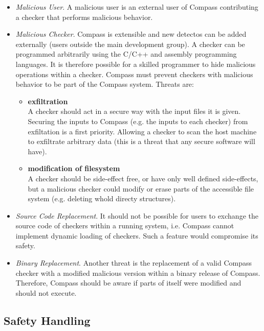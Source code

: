 \begin{itemize}
\item \emph{Malicious User}. A malicious user is an external user of Compass contributing a checker that performs malicious behavior.
\item \emph{Malicious Checker}. Compass is extensible and new detectos can be added externally (users outside the main development group).
  A checker can be programmed arbitrarily using the C/C++ and assembly programming languages. 
  It is therefore possible for a skilled programmer to hide malicious operations within a
  checker.  Compass must prevent checkers with malicious behavior to be part of the
  Compass system. Threats are:
   \begin{itemize}
      \item {\bf exfiltration} \\
         A checker should act in a secure way with the input files it is given.
         Securing the inputs to Compass (e.g. the inputs to each checker) from 
         exfiltation is a first priority. Allowing a checker to scan the host 
         machine to exfiltrate arbitrary data (this is a threat that any secure
         software will have).
      \item {\bf modification of filesystem} \\
         A checker should be side-effect free, or have only well defined side-effects, 
         but a malicious checker could modify or erase parts of the accessible file 
         system (e.g. deleting whold directy structures).
   \end{itemize} 

\item \emph{Source Code Replacement}. It should not be possible for users to exchange the
    source code of checkers within a running system, i.e. Compass cannot implement dynamic
    loading of checkers. Such a feature would compromise its safety.

\item \emph{Binary Replacement}. Another threat is the replacement of a valid Compass
    checker with a modified malicious version within a binary release of Compass.
    Therefore, Compass should be aware if parts of itself were modified and should not
    execute.

\end{itemize} 

\subsection{Safety Handling}

